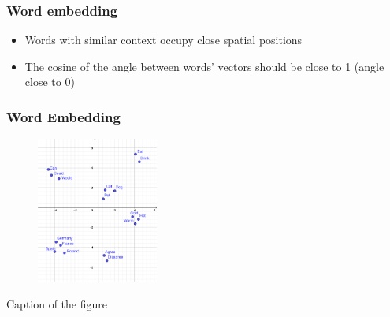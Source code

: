 

\begin{frame}
\frametitle{Word embedding}

	\begin{itemize}
		\item Words with similar context occupy close spatial positions
		\item The cosine of the angle between words' vectors should be close to 1 (angle close to 0)
	\end{itemize}

\end{frame}



\begin{frame}
	\frametitle{Word Embedding}

	\begin{figure}
		\includegraphics[width=4cm]{./figures/Groups}

	\end{figure}
		\begin{center}
		{Caption of the figure}
		\end{center}
	\vspace{-0.5cm}

\end{frame}



